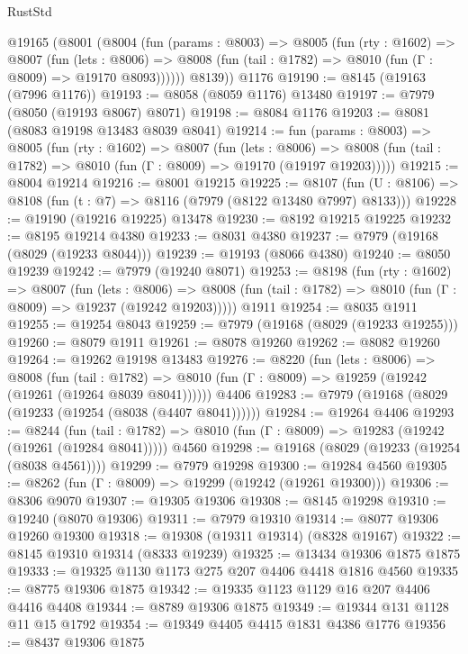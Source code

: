 \begin{lexlean}{RustStd}
\begin{coremodule}
    @19165
      (@8001
        (@8004
          (fun (params : @8003) =>
          @8005
            (fun (rty : @1602) =>
            @8007
              (fun (lets : @8006) =>
              @8008 (fun (tail : @1782) => @8010 (fun (Γ : @8009) => @19170 @8093))))))
        @8139))
    @1176
@19190 := @8145 (@19163 (@7996 @1176))
@19193 := @8058 (@8059 @1176) @13480
@19197 := @7979 (@8050 (@19193 @8067) @8071)
@19198 := @8084 @1176
@19203 := @8081 (@8083 @19198 @13483 @8039 @8041)
@19214 := fun (params : @8003) =>
  @8005
    (fun (rty : @1602) =>
    @8007
      (fun (lets : @8006) =>
      @8008 (fun (tail : @1782) => @8010 (fun (Γ : @8009) => @19170 (@19197 @19203)))))
@19215 := @8004 @19214
@19216 := @8001 @19215
@19225 := @8107
    (fun (U : @8106) => @8108 (fun (t : @7) => @8116 (@7979 (@8122 @13480 @7997) @8133)))
@19228 := @19190 (@19216 @19225) @13478
@19230 := @8192 @19215 @19225
@19232 := @8195 @19214 @4380
@19233 := @8031 @4380
@19237 := @7979 (@19168 (@8029 (@19233 @8044)))
@19239 := @19193 (@8066 @4380)
@19240 := @8050 @19239
@19242 := @7979 (@19240 @8071)
@19253 := @8198
    (fun (rty : @1602) =>
    @8007
      (fun (lets : @8006) =>
      @8008 (fun (tail : @1782) => @8010 (fun (Γ : @8009) => @19237 (@19242 @19203)))))
    @1911
@19254 := @8035 @1911
@19255 := @19254 @8043
@19259 := @7979 (@19168 (@8029 (@19233 @19255)))
@19260 := @8079 @1911
@19261 := @8078 @19260
@19262 := @8082 @19260
@19264 := @19262 @19198 @13483
@19276 := @8220
    (fun (lets : @8006) =>
    @8008
      (fun (tail : @1782) =>
      @8010 (fun (Γ : @8009) => @19259 (@19242 (@19261 (@19264 @8039 @8041))))))
    @4406
@19283 := @7979 (@19168 (@8029 (@19233 (@19254 (@8038 (@4407 @8041))))))
@19284 := @19264 @4406
@19293 := @8244
    (fun (tail : @1782) => @8010 (fun (Γ : @8009) => @19283 (@19242 (@19261 (@19284 @8041)))))
    @4560
@19298 := @19168 (@8029 (@19233 (@19254 (@8038 @4561))))
@19299 := @7979 @19298
@19300 := @19284 @4560
@19305 := @8262 (fun (Γ : @8009) => @19299 (@19242 (@19261 @19300)))
@19306 := @8306 @9070
@19307 := @19305 @19306
@19308 := @8145 @19298
@19310 := @19240 (@8070 @19306)
@19311 := @7979 @19310
@19314 := @8077 @19306 @19260 @19300
@19318 := @19308 (@19311 @19314) (@8328 @19167)
@19322 := @8145 @19310 @19314 (@8333 @19239)
@19325 := @13434 @19306 @1875 @1875
@19333 := @19325 @1130 @1173 @275 @207 @4406 @4418 @1816 @4560
@19335 := @8775 @19306 @1875
@19342 := @19335 @1123 @1129 @16 @207 @4406 @4416 @4408
@19344 := @8789 @19306 @1875
@19349 := @19344 @131 @1128 @11 @15 @1792
@19354 := @19349 @4405 @4415 @1831 @4386 @1776
@19356 := @8437 @19306 @1875

\end{coremodule}
\end{lexlean}
